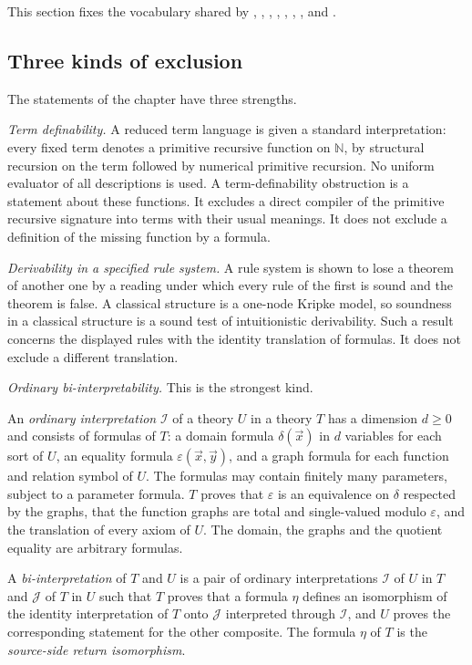 This section fixes the vocabulary shared by ,
, , ,
, , ,
 and .

\subsection{Three kinds of exclusion}
\label{obs:sec:kinds}

The statements of the chapter have three strengths.

\emph{Term definability.} A reduced term language is given a standard
interpretation: every fixed term denotes a primitive recursive function on
$\mathbb{N}$, by structural recursion on the term followed by numerical
primitive recursion. No uniform evaluator of all descriptions is used. A
term-definability obstruction is a statement about these functions. It
excludes a direct compiler of the primitive recursive signature into terms with
their usual meanings. It does not exclude a definition of the missing function
by a formula.

\emph{Derivability in a specified rule system.} A rule system is shown to lose
a theorem of another one by a reading under which every rule of the first is
sound and the theorem is false. A classical structure is a one-node Kripke
model, so soundness in a classical structure is a sound test of intuitionistic
derivability. Such a result concerns the displayed rules with the identity
translation of formulas. It does not exclude a different translation.

\emph{Ordinary bi-interpretability.} This is the strongest kind.

\begin{definition}
\label{obs:def:biinterp}
An \emph{ordinary interpretation} $\mathcal{I}$ of a theory $U$ in a theory $T$
has a dimension $d\ge 0$ and consists of formulas of $T$: a domain formula
$\delta(\vec x)$ in $d$ variables for each sort of $U$, an equality formula
$\varepsilon(\vec x,\vec y)$, and a graph formula for each function and
relation symbol of $U$. The formulas may contain finitely many parameters,
subject to a parameter formula. $T$ proves that $\varepsilon$ is an equivalence
on $\delta$ respected by the graphs, that the function graphs are total and
single-valued modulo $\varepsilon$, and the translation of every axiom of $U$.
The domain, the graphs and the quotient equality are arbitrary formulas.

A \emph{bi-interpretation} of $T$ and $U$ is a pair of ordinary interpretations
$\mathcal{I}$ of $U$ in $T$ and $\mathcal{J}$ of $T$ in $U$ such that $T$
proves that a formula $\eta$ defines an isomorphism of the identity
interpretation of $T$ onto $\mathcal{J}$ interpreted through $\mathcal{I}$, and
$U$ proves the corresponding statement for the other composite. The formula
$\eta$ of $T$ is the \emph{source-side return isomorphism}.
\end{definition}

